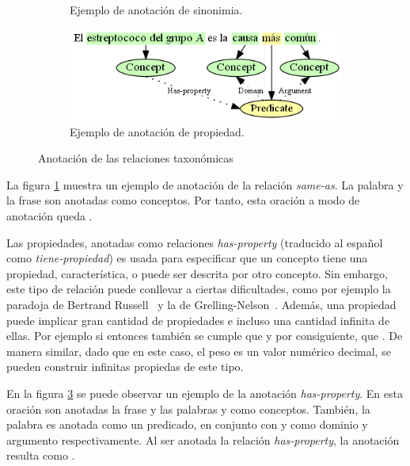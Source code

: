 \begin{figure}[H]
\begin{subfigure}{4.2in}
		\caption{Ejemplo de anotación de sinonimia.}
		\vspace{0.4in}
		\label{fig:annotation_example_same_as}
	\end{subfigure}
	\begin{subfigure}{3.9in}
		\includegraphics[width=\linewidth]{graphics/annotation_example_has_property.png}
		\caption{Ejemplo de anotación de propiedad.}
		\label{fig:annotation_example_has_property}
	\end{subfigure}
	\caption{Anotación de las relaciones taxonómicas}
\end{figure}

La figura \ref{fig:annotation_example_same_as} muestra un ejemplo de anotación de la relación \textit{same-as}. La palabra  y la frase  son anotadas como conceptos. Por tanto, esta oración a modo de anotación queda .

Las propiedades, anotadas como relaciones \textit{has-property} (traducido al español como \textit{tiene-propiedad}) es usada para especificar que un concepto tiene una propiedad, característica, o puede ser descrita por otro concepto. Sin embargo, este tipo de relación puede conllevar a ciertas dificultades, como por ejemplo la paradoja de Bertrand Russell~\cite{ref:15} y la de Grelling-Nelson~\cite{ref:16}. Además, una propiedad puede implicar gran cantidad de propiedades e incluso una cantidad infinita de ellas. Por ejemplo si  entonces también se cumple que  y por consiguiente, que . De manera similar, dado que en este caso, el peso es un valor numérico decimal, se pueden construir infinitas propiedas de este tipo.

En la figura \ref{fig:annotation_example_has_property} se puede observar un ejemplo de la anotación \textit{has-property}. En esta oración son anotadas la frase  y las palabras  y  como conceptos. También, la palabra  es anotada como un predicado, en conjunto con  y  como dominio y argumento respectivamente. Al ser anotada la relación \textit{has-property}, la anotación resulta como .

